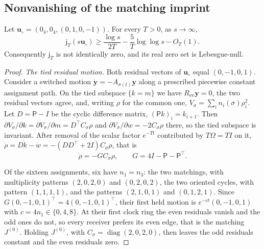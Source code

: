 \subsection{Nonvanishing of the matching imprint}\label{app:sel_nonvanishing}

\begin{lemma}\label{lem:sel_nonvanishing}
Let $\mathbf u_\circ=(0_4,0_4,(0,1,0,-1))$. For every $T>0$, as $s\to\infty$,
\begin{equation}
\mathsf j_T(s\mathbf u_\circ)\ge\frac{\log s}{2T}-\frac5T\log\log s-O_T(1).
\label{eq:sel_nonvanishing}
\end{equation}
Consequently $\mathsf j_T$ is not identically zero, and its real zero set is Lebesgue-null.
\end{lemma}

\begin{proof}
\emph{The tied residual motion.} Both residual vectors of $\mathbf u_\circ$ equal $(0,-1,0,1)$. Consider a switched motion $\dot{\mathbf y}=-A_{\sigma(t)}\mathbf y$ along a prescribed piecewise constant assignment path. On the tied subspace $\{k=m\}$ we have $R_{\mathrm{ev}}\mathbf y=0$, the two residual vectors agree, and, writing $\rho$ for the common one, $V_\sigma=\sum_in_i(\sigma)\rho_i^2$. Let $D=\mathsf P-I$ be the cyclic difference matrix, $(\mathsf Pk)_i=k_{i+1}$. Then $\partial V_\sigma/\partial k=\partial V_\sigma/\partial m=D^\top C_\sigma\rho$ and $\partial V_\sigma/\partial w=-2C_\sigma\rho$ there, so the tied subspace is invariant. After removal of the scalar factor $e^{-Tt}$ contributed by $T\Omega=TI$ on it, $\dot\rho=D\dot k-\dot w=-(DD^\top+2I)C_\sigma\rho$, that is
\begin{equation}
\dot\rho=-GC_\sigma\rho,\qquad G=4I-\mathsf P-\mathsf P^\top.
\label{eq:sel_tied_residual}
\end{equation}

Of the sixteen assignments, six have $n_1=n_3$: the two matchings, with multiplicity patterns $(2,0,2,0)$ and $(0,2,0,2)$, the two oriented cycles, with pattern $(1,1,1,1)$, and the patterns $(2,1,0,1)$ and $(0,1,2,1)$. Since $G(0,-1,0,1)^\top=4(0,-1,0,1)^\top$, their first held motion is $e^{-ct}(0,-1,0,1)$ with $c=4n_1\in\{0,4,8\}$. At their first clock ring the even residuals vanish and the odd ones do not, so every receiver prefers its even edge, that is the matching $J^{(0)}$. Holding $J^{(0)}$, with $C_\sigma=\operatorname{diag}(2,0,2,0)$, then leaves the odd residuals constant and the even residuals zero.


\end{proof}

